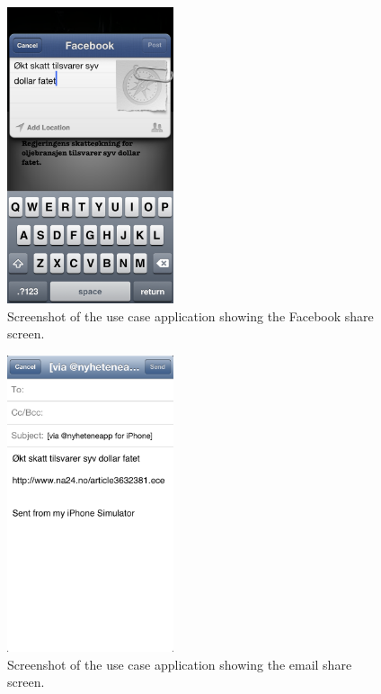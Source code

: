 \begin{figure}[!htbp]
\centering
\includegraphics[width=49mm]{GFX/usecase/facebook.png}
\caption{Screenshot of the use case application showing the Facebook share screen.}
\label{usecase_facebook}
\end{figure}

\begin{figure}[!htbp]
\centering
\includegraphics[width=49mm]{GFX/usecase/mail.png}
\caption{Screenshot of the use case application showing the email share screen.}
\label{usecase_mail}
\end{figure}

